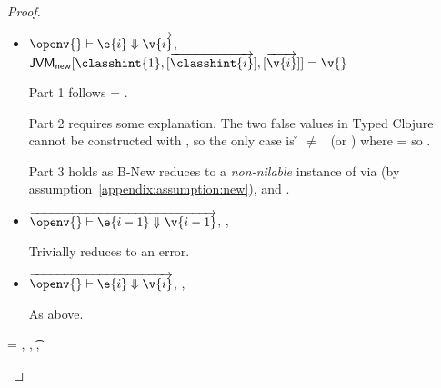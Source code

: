 \begin{lemma}
\begin{proof}
\begin{case}[T-NewStatic]
\begin{itemize}
  \item[]
\begin{subcase}[B-New]
  $
  \overrightarrow{
  \opsem {\openv{}}
         {\e{i}}
         {\v{i}}
       }$,
         $\newjava {\classhint{1}}
                  {\overrightarrow{\classhint{i}}}
                  {\overrightarrow{\v{i}}}
                  {\v{}}$

Part 1 follows \object{} = \emptyobject{}.

Part 2 requires some explanation. The two false values in Typed Clojure
cannot be constructed with \newliteral, so the only case is \v{} $\not=$ \false\ (or \nil)
where \thenprop{\prop{}} = \topprop{} so \satisfies{\openv{}}{\thenprop{\prop{}}}.

Part 3 holds as B-New reduces to a \emph{non-nilable}
instance of \class{} via \newjavaliteral (by assumption~\ref{appendix:assumption:new}), and \javatotc{\classhint{}}{\t{}}.

\end{subcase}
  \item[]

\begin{subcase}[BE-New1] $\overrightarrow{
  \opsem {\openv{}}
         {\e{i-1}}
         {\v{i-1}}
       }$,
  \opsem {\openv{}}
         {}
         {\errorvalv{}},
  \opsem {\openv{}} {\e{}} {\errorvalv{}}

        Trivially reduces to an error.

\end{subcase}
  \item[]

\begin{subcase}[BE-New2] 
  $\overrightarrow{
  \opsem {\openv{}}
         {\e{i}}
         {\v{i}}
       }$,
                  {}
                  {}
                  {\errorvalv{}},
        \opsem {\openv{}} {\e{}} {\errorvalv{}}

        As above.

\end{subcase}
\end{itemize}
\end{case}

\begin{case}[T-FieldStatic]
  \e{} = { {} {\fld{}} {}},
   {\class{}},
   {\t{}},
  \judgementtwo {\propenv{}} {} {\class{}}


\end{case}
\end{proof}
\end{lemma}
